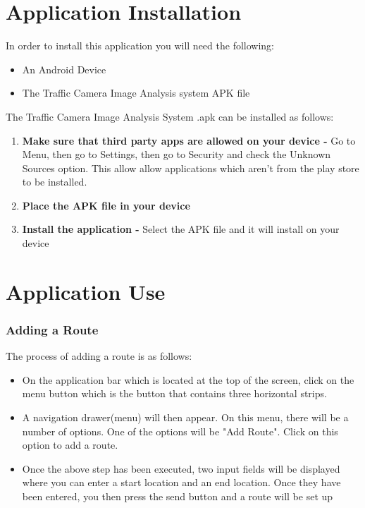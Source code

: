 \documentclass[a4paper,12pt]{article}
\begin{document}
\section{Application Installation}
In order to install this application you will need the following:
\begin{itemize}
\item An Android Device
\item The Traffic Camera Image Analysis system APK file
\end{itemize}

The Traffic Camera Image Analysis System .apk can be installed as follows:
\begin{enumerate}
\item \textbf{Make sure that third party apps are allowed on your device -} Go to Menu, then go to Settings, then go to Security and check the Unknown Sources option. This allow allow applications which aren't from the play store to be installed.
\item \textbf{Place the APK file in your device} 
\item \textbf{Install the application -} Select the APK file and it will install on your device
\end{enumerate}

\section{Application Use}
\subsubsection{Adding a Route}
The process of adding a route is as follows:
\begin{itemize}
    \item On the application bar which is located at the top of the screen, click on the menu button which is the button that contains three horizontal strips.
    \item A navigation drawer(menu) will then appear. On this menu, there will be a number of options. One of the options will be "Add Route". Click on this option to add a route.
    \item Once the above step has been executed, two input fields will be displayed  where you can enter a start location and an end location. Once they have been entered, you then press the send button and a route will be set up
\end{itemize}
\end{document}

